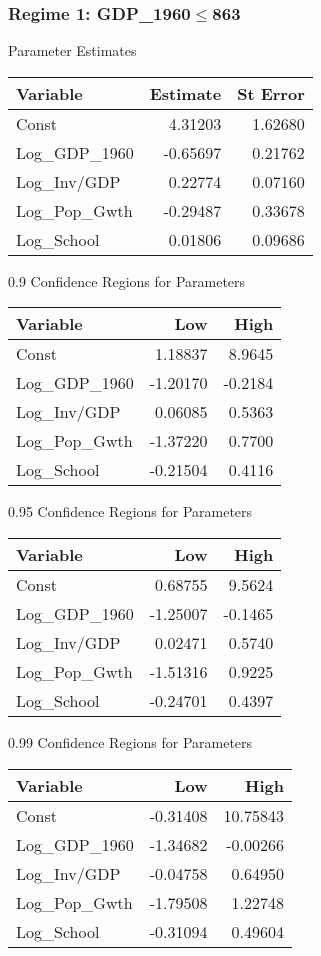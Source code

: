 \subsubsection*{Regime 1: GDP\_1960$\leq$863 } 
Parameter Estimates \\
\begin{tabular}{l*{2}{r}}
\toprule
Variable    &   Estimate     &   St Error \\
\midrule 
Const   &    4.31203   &   1.62680 \\
Log\_GDP\_1960   &   -0.65697   &   0.21762 \\
Log\_Inv/GDP   &    0.22774   &   0.07160 \\
Log\_Pop\_Gwth   &   -0.29487   &   0.33678 \\
Log\_School   &    0.01806   &   0.09686 \\
\bottomrule
\end{tabular}
\bigskip 

0.9 Confidence Regions for Parameters \\
\begin{tabular}{l*{2}{r}}
\toprule
Variable   &    Low            &   High \\
\midrule 
Const   &    1.18837   &    8.9645 \\
Log\_GDP\_1960   &   -1.20170   &   -0.2184 \\
Log\_Inv/GDP   &    0.06085   &    0.5363 \\
Log\_Pop\_Gwth   &   -1.37220   &    0.7700 \\
Log\_School   &   -0.21504   &    0.4116 \\
\bottomrule
\end{tabular}
\bigskip 

0.95 Confidence Regions for Parameters \\
\begin{tabular}{l*{2}{r}}
\toprule
Variable   &    Low            &   High \\
\midrule 
Const   &    0.68755   &    9.5624 \\
Log\_GDP\_1960   &   -1.25007   &   -0.1465 \\
Log\_Inv/GDP   &    0.02471   &    0.5740 \\
Log\_Pop\_Gwth   &   -1.51316   &    0.9225 \\
Log\_School   &   -0.24701   &    0.4397 \\
\bottomrule
\end{tabular}
\bigskip 

0.99 Confidence Regions for Parameters \\
\begin{tabular}{l*{2}{r}}
\toprule
Variable   &    Low            &   High \\
\midrule 
Const   &   -0.31408   &   10.75843 \\
Log\_GDP\_1960   &   -1.34682   &   -0.00266 \\
Log\_Inv/GDP   &   -0.04758   &    0.64950 \\
Log\_Pop\_Gwth   &   -1.79508   &    1.22748 \\
Log\_School   &   -0.31094   &    0.49604 \\
\bottomrule
\end{tabular}
\bigskip 


